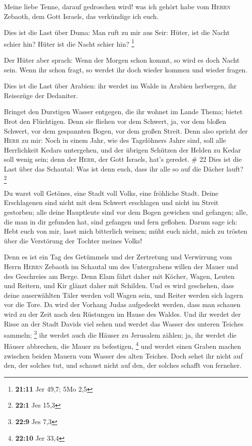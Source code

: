  Meine liebe Tenne, darauf gedroschen wird! was ich
gehört habe vom \textsc{Herrn} Zebaoth, dem Gott Israels, das verkündige
ich euch.

 Dies ist die Last über Duma: Man ruft zu mir aus Seir:
Hüter, ist die Nacht schier hin? Hüter ist die Nacht schier hin?
\footnote{\textbf{21:11} Jer 49,7; 5Mo 2,5}

 Der Hüter aber sprach: Wenn der Morgen schon kommt, so
wird es doch Nacht sein. Wenn ihr schon fragt, so werdet ihr doch wieder
kommen und wieder fragen.

 Dies ist die Last über Arabien: ihr werdet im Walde in
Arabien herbergen, ihr Reisezüge der Dedaniter.

 Bringet den Durstigen Wasser entgegen, die ihr wohnet im
Lande Thema; bietet Brot den Flüchtigen.  Denn sie
fliehen vor dem Schwert, ja, vor dem bloßen Schwert, vor dem gespannten
Bogen, vor dem großen Streit.  Denn also spricht der
\textsc{Herr} zu mir: Noch in einem Jahr, wie des Tagelöhners Jahre
sind, soll alle Herrlichkeit Kedars untergehen,  und der
übrigen Schützen der Helden zu Kedar soll wenig sein; denn der
\textsc{Herr}, der Gott Israels, hat's geredet. \# 22 
Dies ist die Last über das Schautal: Was ist denn euch, dass ihr alle so
auf die Dächer lauft? \footnote{\textbf{22:1} Jes 15,3}

 Du warst voll Getönes, eine Stadt voll Volks, eine
fröhliche Stadt. Deine Erschlagenen sind nicht mit dem Schwert
erschlagen und nicht im Streit gestorben;  alle deine
Hauptleute sind vor dem Bogen gewichen und gefangen; alle, die man in
dir gefunden hat, sind gefangen und fern geflohen.  Darum
sage ich: Hebt euch von mir, lasst mich bitterlich weinen; müht euch
nicht, mich zu trösten über die Verstörung der Tochter meines Volks!

 Denn es ist ein Tag des Getümmels und der Zertretung und
Verwirrung vom Herrn \textsc{Herrn} Zebaoth im Schautal um des
Untergrabens willen der Mauer und des Geschreies am Berge.
 Denn Elam fährt daher mit Köcher, Wagen, Leuten und
Reitern, und Kir glänzt daher mit Schilden.  Und es wird
geschehen, dass deine auserwählten Täler werden voll Wagen sein, und
Reiter werden sich lagern vor die Tore.  Da wird der
Vorhang Judas aufgedeckt werden, dass man schauen wird zu der Zeit nach
den Rüstungen im Hause des Waldes.  Und ihr werdet der
Risse an der Stadt Davids viel sehen und werdet das Wasser des unteren
Teiches sammeln; \footnote{\textbf{22:9} Jes 7,3}  ihr
werdet auch die Häuser zu Jerusalem zählen; ja, ihr werdet die Häuser
abbrechen, die Mauer zu befestigen, \footnote{\textbf{22:10} Jer 33,4}
 und werdet einen Graben machen zwischen beiden Mauern
vom Wasser des alten Teiches. Doch sehet ihr nicht auf den, der solches
tut, und schauet nicht auf den, der solches schafft von ferneher.

